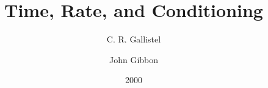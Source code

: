 \documentclass[a4paper,12pt]{article}
\title{Time, Rate, and Conditioning}
\author{C. R. Gallistel \and John Gibbon}
\date{2000}
\begin{document}
{\scshape\bfseries \maketitle}
\end{document}
